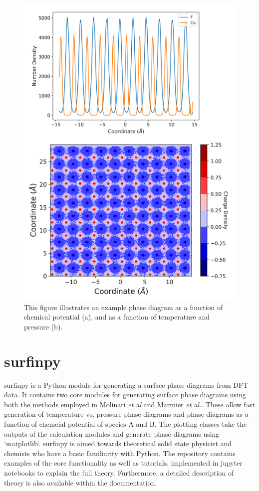 \documentclass[journal=jacsat,manuscript=article]{achemso}
\begin{document}
\begin{figure}[!htb]
    \centering\includegraphics[width=6in]{../Figure_1.png}
    \caption{This figure illustrates an example phase diagram as a function of chemical potential (a), and as a function of temperature and pressure (b).}
    \label{Figure 1}
  \end{figure}

\section{surfinpy}

surfinpy is a Python module for generating a surface phase diagrams from DFT data. 
It contains two core modules for generating surface phase diagrams using both the methods employed in Molinari \textit{et al} \cite{Molinari2012} and Marmier \textit{et al.}\cite{Marmier2004}. 
These allow fast generation of temperature vs. pressure phase diagrams and phase diagrams as a function of chemcial potential of species A and B. 
The plotting classes take the outputs of the calculation modules and generate phase diagrams using `matplotlib`. 
surfinpy is aimed towards theoretical solid state physicist and chemists who have a basic familiarity with Python. 
The repository contains examples of the core functionality as well as tutorials, implemented in jupyter notebooks to explain the full theory.
Furthermore, a detailed description of theory is also available within the documentation. 
\end{document}
